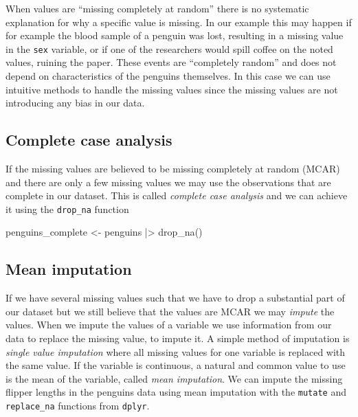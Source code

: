 \documentclass[
  letterpaper,
  DIV=11,
  numbers=noendperiod]{scrreprt}
\newenvironment{Shaded}{\begin{snugshade}}{\end{snugshade}}
\newcommand{\FunctionTok}[1]{\textcolor[rgb]{0.28,0.35,0.67}{#1}}
\newcommand{\NormalTok}[1]{\textcolor[rgb]{0.00,0.23,0.31}{#1}}
\newcommand{\OtherTok}[1]{\textcolor[rgb]{0.00,0.23,0.31}{#1}}
\newcommand{\SpecialCharTok}[1]{\textcolor[rgb]{0.37,0.37,0.37}{#1}}
\begin{document}
When values are ``missing completely at random'' there is no systematic
explanation for why a specific value is missing. In our example this may
happen if for example the blood sample of a penguin was lost, resulting
in a missing value in the \texttt{sex} variable, or if one of the
researchers would spill coffee on the noted values, ruining the paper.
These events are ``completely random'' and does not depend on
characteristics of the penguins themselves. In this case we can use
intuitive methods to handle the missing values since the missing values
are not introducing any bias in our data.

\subsection{Complete case analysis}\label{complete-case-analysis}

If the missing values are believed to be missing completely at random
(MCAR) and there are only a few missing values we may use the
observations that are complete in our dataset. This is called
\emph{complete case analysis} and we can achieve it using the
\texttt{drop\_na} function

\begin{Shaded}
\begin{Highlighting}[]
\NormalTok{penguins\_complete }\OtherTok{\textless{}{-}}\NormalTok{ penguins }\SpecialCharTok{|\textgreater{}} \FunctionTok{drop\_na}\NormalTok{()}
\end{Highlighting}
\end{Shaded}

\subsection{Mean imputation}\label{mean-imputation}

If we have several missing values such that we have to drop a
substantial part of our dataset but we still believe that the values are
MCAR we may \emph{impute} the values. When we impute the values of a
variable we use information from our data to replace the missing value,
to impute it. A simple method of imputation is \emph{single value
imputation} where all missing values for one variable is replaced with
the same value. If the variable is continuous, a natural and common
value to use is the mean of the variable, called \emph{mean imputation}.
We can impute the missing flipper lengths in the penguins data using
mean imputation with the \texttt{mutate} and \texttt{replace\_na}
functions from \texttt{dplyr}.
\end{document}
